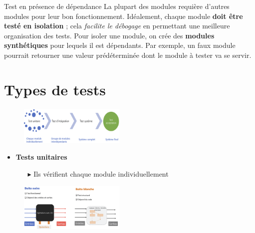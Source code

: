 \documentclass[16pt]{report}
\begin{document}
\begin{multicols*}{2}
       \begin{Concept}{Test en présence de dépendance}{}
           La plupart des modules requière d'autres modules pour leur bon fonctionnement. 
           Idéalement, chaque module \textbf{doit être testé en isolation} ; cela 
           \textit{facilite le débogage} en permettant une meilleure organisation des tests. 
           Pour isoler une module, on crée des \textbf{modules synthétiques} pour lequels il est dépendants. 
           Par exemple, un faux module pourrait retourner une valeur prédéterminée dont le module à tester 
           va se servir. 
       \end{Concept}


       \section{Types de tests}


       \begin{figure}[H]
        \begin{center}
            \includegraphics[width=0.45\textwidth]{TypeDeTest.png}
        \end{center}
       \end{figure}


       \begin{itemize}
        \item \textbf{Tests unitaires}  
            \begin{itemize}
                \item[$\blacktriangleright$] Ils vérifient chaque module individuellement 
            \end{itemize}
       \end{itemize}

            

       \begin{figure}[H]
        \begin{center}
            \includegraphics[width=0.45\textwidth]{test1.png}
        \end{center}
       \end{figure}
       


\end{multicols*}
\end{document}
